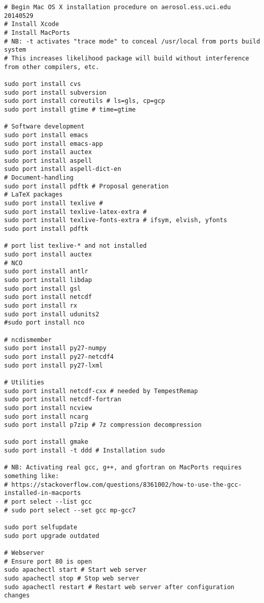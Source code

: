 \documentclass[12pt,twoside]{article}
\begin{document}
\begin{verbatim}
# Begin Mac OS X installation procedure on aerosol.ess.uci.edu 20140529
# Install Xcode
# Install MacPorts
# NB: -t activates "trace mode" to conceal /usr/local from ports build system
# This increases likelihood package will build without interference from other compilers, etc.

sudo port install cvs
sudo port install subversion
sudo port install coreutils # ls=gls, cp=gcp
sudo port install gtime # time=gtime

# Software development
sudo port install emacs
sudo port install emacs-app
sudo port install auctex
sudo port install aspell
sudo port install aspell-dict-en
# Document-handling
sudo port install pdftk # Proposal generation
# LaTeX packages
sudo port install texlive # 
sudo port install texlive-latex-extra # 
sudo port install texlive-fonts-extra # ifsym, elvish, yfonts
sudo port install pdftk

# port list texlive-* and not installed
sudo port install auctex
# NCO
sudo port install antlr
sudo port install libdap
sudo port install gsl
sudo port install netcdf
sudo port install rx
sudo port install udunits2
#sudo port install nco

# ncdismember
sudo port install py27-numpy
sudo port install py27-netcdf4
sudo port install py27-lxml

# Utilities
sudo port install netcdf-cxx # needed by TempestRemap
sudo port install netcdf-fortran
sudo port install ncview
sudo port install ncarg
sudo port install p7zip # 7z compression decompression

sudo port install gmake
sudo port install -t ddd # Installation sudo

# NB: Activating real gcc, g++, and gfortran on MacPorts requires something like:
# https://stackoverflow.com/questions/8361002/how-to-use-the-gcc-installed-in-macports
# port select --list gcc
# sudo port select --set gcc mp-gcc7

sudo port selfupdate
sudo port upgrade outdated

# Webserver
# Ensure port 80 is open
sudo apachectl start # Start web server
sudo apachectl stop # Stop web server
sudo apachectl restart # Restart web server after configuration changes
\end{verbatim}
\end{document}
